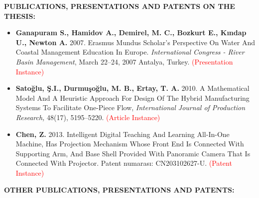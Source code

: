 \textbf{PUBLICATIONS, PRESENTATIONS AND PATENTS ON THE THESIS:} 
\vspace{-3mm}
\begin{itemize}[leftmargin=0.7cm,itemsep=0.5em,labelsep=5mm] %
	\item \textbf{Ganapuram S., Hamidov A., Demirel, M. C., Bozkurt E., Kındap U., Newton A.} %
	2007. Erasmus Mundus Scholar's Perspective On Water And Coastal
	Management Education In Europe. 
	\textit{International Congress - River Basin Management}, 
	March 22--24, 2007 Antalya, Turkey. \textcolor{red}{(Presentation Instance)}
	
	\item \textbf{Satoğlu, Ş.I., Durmuşoğlu, M. B., Ertay, T. A.} 2010. A Mathematical Model  %
	And A Heuristic Approach For Design Of The Hybrid Manufacturing Systems 
	To Facilitate One-Piece Flow, 
	\textit{International Journal of Production Research,}
	48(17), 5195--5220. \textcolor{red}{(Article Instance)}
	
	\item  \textbf{Chen, Z.} 2013. Intelligent Digital Teaching And Learning All-In-One Machine, %
	Has Projection Mechanism Whose Front End Is Connected With Supporting
	Arm, And Base Shell Provided With Panoramic Camera That Is Connected With
	Projector. Patent numarası: CN203102627-U. \textcolor{red}{(Patent Instance)}
\end{itemize}


\textbf{OTHER PUBLICATIONS, PRESENTATIONS AND PATENTS:} 
\vspace{-3mm}

\newpage %
\thispagestyle{empty} %
\def\sirtyili{2020} %
\def\studentname{F. M. SURNAME} %
\def\thesisthickness{25mm} %

